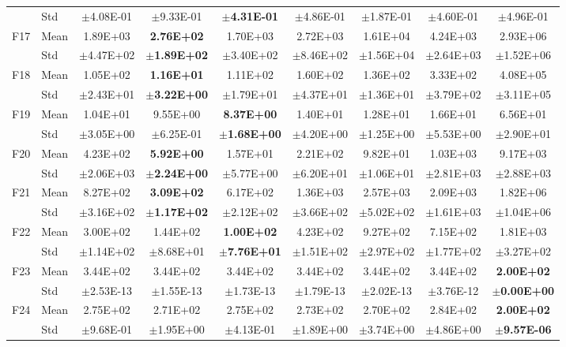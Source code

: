 \begin{table}[htbp]
{\begin{tabular}{clccccccc}
 & Std & $\pm$4.08E-01 & $\pm$9.33E-01 & $\pm$\textbf{4.31E-01} & $\pm$4.86E-01 & $\pm$1.87E-01 & $\pm$4.60E-01 & $\pm$4.96E-01 \\
F17 & Mean & 1.89E+03 & \textbf{2.76E+02} & 1.70E+03 & 2.72E+03 & 1.61E+04 & 4.24E+03 & 2.93E+06 \\
 & Std & $\pm$4.47E+02 & $\pm$\textbf{1.89E+02} & $\pm$3.40E+02 & $\pm$8.46E+02 & $\pm$1.56E+04 & $\pm$2.64E+03 & $\pm$1.52E+06 \\
F18 & Mean & 1.05E+02 & \textbf{1.16E+01} & 1.11E+02 & 1.60E+02 & 1.36E+02 & 3.33E+02 & 4.08E+05 \\
 & Std & $\pm$2.43E+01 & $\pm$\textbf{3.22E+00} & $\pm$1.79E+01 & $\pm$4.37E+01 & $\pm$1.36E+01 & $\pm$3.79E+02 & $\pm$3.11E+05 \\
F19 & Mean & 1.04E+01 & 9.55E+00 & \textbf{8.37E+00} & 1.40E+01 & 1.28E+01 & 1.66E+01 & 6.56E+01 \\
 & Std & $\pm$3.05E+00 & $\pm$6.25E-01 & $\pm$\textbf{1.68E+00} & $\pm$4.20E+00 & $\pm$1.25E+00 & $\pm$5.53E+00 & $\pm$2.90E+01 \\
F20 & Mean & 4.23E+02 & \textbf{5.92E+00} & 1.57E+01 & 2.21E+02 & 9.82E+01 & 1.03E+03 & 9.17E+03 \\
 & Std & $\pm$2.06E+03 & $\pm$\textbf{2.24E+00} & $\pm$5.77E+00 & $\pm$6.20E+01 & $\pm$1.06E+01 & $\pm$2.81E+03 & $\pm$2.88E+03 \\
F21 & Mean & 8.27E+02 & \textbf{3.09E+02} & 6.17E+02 & 1.36E+03 & 2.57E+03 & 2.09E+03 & 1.82E+06 \\
 & Std & $\pm$3.16E+02 & $\pm$\textbf{1.17E+02} & $\pm$2.12E+02 & $\pm$3.66E+02 & $\pm$5.02E+02 & $\pm$1.61E+03 & $\pm$1.04E+06 \\
F22 & Mean & 3.00E+02 & 1.44E+02 & \textbf{1.00E+02} & 4.23E+02 & 9.27E+02 & 7.15E+02 & 1.81E+03 \\
 & Std & $\pm$1.14E+02 & $\pm$8.68E+01 & $\pm$\textbf{7.76E+01} & $\pm$1.51E+02 & $\pm$2.97E+02 & $\pm$1.77E+02 & $\pm$3.27E+02 \\
F23 & Mean & 3.44E+02 & 3.44E+02 & 3.44E+02 & 3.44E+02 & 3.44E+02 & 3.44E+02 & \textbf{2.00E+02} \\
 & Std & $\pm$2.53E-13 & $\pm$1.55E-13 & $\pm$1.73E-13 & $\pm$1.79E-13 & $\pm$2.02E-13 & $\pm$3.76E-12 & $\pm$\textbf{0.00E+00} \\
F24 & Mean & 2.75E+02 & 2.71E+02 & 2.75E+02 & 2.73E+02 & 2.70E+02 & 2.84E+02 & \textbf{2.00E+02} \\
 & Std & $\pm$9.68E-01 & $\pm$1.95E+00 & $\pm$4.13E-01 & $\pm$1.89E+00 & $\pm$3.74E+00 & $\pm$4.86E+00 & $\pm$\textbf{9.57E-06} \\

\end{tabular}}
\end{table}
